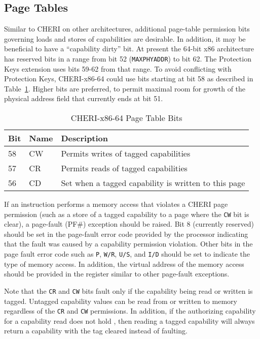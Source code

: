 \subsection{Page Tables}

Similar to CHERI on other architectures, additional page-table
permission bits governing loads and stores of capabilities are
desirable.  In addition, it may be beneficial to have a ``capability
dirty'' bit.  At present the 64-bit x86 architecture has reserved bits
in a range from bit 52 (\texttt{MAXPHYADDR}) to bit 62.  The Protection Keys
extension uses bits 59-62 from that range.  To avoid conflicting with
Protection Keys, CHERI-x86-64 could use bits starting at bit 58 as described in Table~\ref{table:x86:pte}.  Higher bits are
preferred, to permit maximal room for growth of the physical address
field that currently ends at bit 51.

\begin{table}
\begin{center}
\begin{tabular}{lll}
\toprule
Bit & Name & Description \\
\midrule
58 & CW & Permits writes of tagged capabilities \\
57 & CR & Permits reads of tagged capabilities \\
56 & CD & Set when a tagged capability is written to this page \\
\bottomrule
\end{tabular}
\end{center}
\caption{CHERI-x86-64 Page Table Bits}
\label{table:x86:pte}
\end{table}

If an instruction performs a memory access that violates a CHERI page
permission (such as a store of a tagged capability to a page where the
\texttt{CW} bit is clear), a page-fault (PF\#) exception should be
raised.  Bit 8 (currently reserved) should be set in the page-fault
error code provided by the processor indicating that the fault was
caused by a capability permission violation.  Other bits in the page
fault error code such as \texttt{P}, \texttt{W/R}, \texttt{U/S}, and
\texttt{I/D} should be set to indicate the type of memory access.  In
addition, the virtual address of the memory access should be provided
in the \CRTWO{} register similar to other page-fault exceptions.

Note that the \texttt{CR} and \texttt{CW} bits fault only if the
capability being read or written is tagged.  Untagged capability
values can be read from or written to memory regardless of the
\texttt{CR} and \texttt{CW} permissions.  In addition, if the
authorizing capability for a capability read does not hold \cappermLC,
then reading a tagged capability will always return a capability with
the tag cleared instead of faulting.

